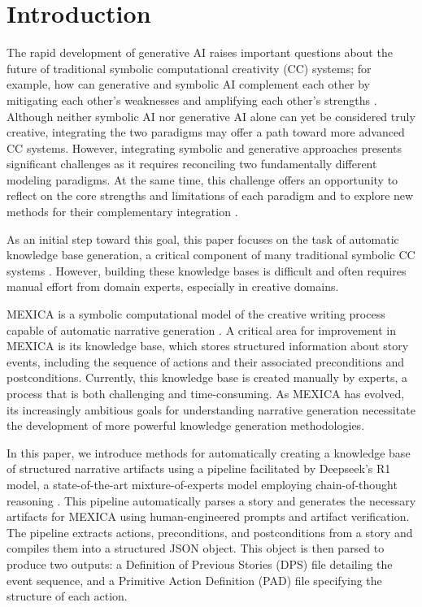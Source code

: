 \documentclass[phd,electronic,oneside,twosidetoc,letterpaper,chaptercenter,parttop,lof]{byumsphd}
\begin{document}
\section{Introduction}
The rapid development of generative AI raises important questions about the future of traditional symbolic computational creativity (CC) systems; for example, how can generative and symbolic AI complement each other by mitigating each other's weaknesses and amplifying each other's strengths \cite{veale2024symbolic}. Although neither symbolic AI nor generative AI alone can yet be considered truly creative, integrating the two paradigms may offer a path toward more advanced CC systems.  However, integrating symbolic and generative approaches presents significant challenges as it requires reconciling two fundamentally different modeling paradigms. At the same time, this challenge offers an opportunity to reflect on the core strengths and limitations of each paradigm and to explore new methods for their complementary integration \cite{perez2023narrative}.

As an initial step toward this goal, this paper focuses on the task of automatic knowledge base generation, a critical component of many traditional symbolic CC systems \cite{ventura2017howto}. However, building these knowledge bases is difficult and often requires manual effort from domain experts, especially in creative domains.

MEXICA is a symbolic computational model of the creative writing process capable of automatic narrative generation \cite{perez1999mexica,perez2001mexica}. A critical area for improvement in MEXICA is its knowledge base, which stores structured information about story events, including the sequence of actions and their associated preconditions and postconditions. Currently, this knowledge base is created manually by experts, a process that is both challenging and time-consuming. As MEXICA has evolved, its increasingly ambitious goals for understanding narrative generation necessitate the development of more powerful knowledge generation methodologies.

In this paper, we introduce methods for automatically creating a knowledge base of structured narrative artifacts \cite{VallsVargas2017TowardsAE,chambers-jurafsky-2008-unsupervised} using a pipeline facilitated by Deepseek's R1 model, a state-of-the-art mixture-of-experts model employing chain-of-thought reasoning \cite{deepseek2025r1}. This pipeline automatically parses a story and generates the necessary artifacts for MEXICA using human-engineered prompts and artifact verification. The pipeline extracts actions, preconditions, and postconditions from a story and compiles them into a structured JSON object. This object is then parsed to produce two outputs: a Definition of Previous Stories (DPS) file detailing the event sequence, and a Primitive Action Definition (PAD) file specifying the structure of each action.
\end{document}
